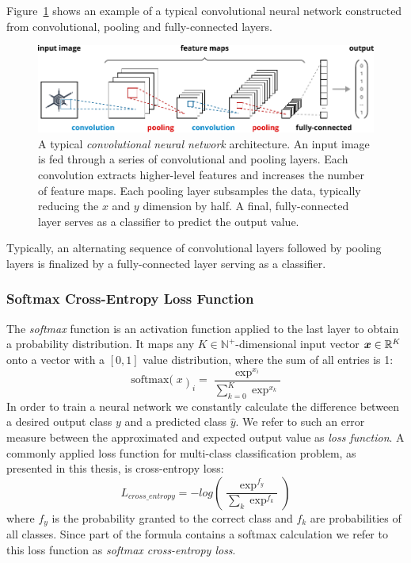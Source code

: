 	Figure~\ref{fig:convnet} shows an example of a typical convolutional neural network constructed from convolutional, pooling and fully-connected layers.
		\begin{figure}[tp]
  		\centering
    	\includegraphics{img/convnet.pdf}
    	\caption{A typical \emph{convolutional neural network} architecture. An input image is fed through a series of convolutional and pooling layers. Each convolution extracts higher-level features and increases the number of feature maps. Each pooling layer subsamples the data, typically reducing the $x$ and $y$ dimension by half. A final, fully-connected layer serves as a classifier to predict the output value.}
    	\label{fig:convnet}
	\end{figure}
	Typically, an alternating sequence of convolutional layers followed by pooling layers is finalized by a fully-connected layer serving as a  classifier.

\subsubsection{Softmax Cross-Entropy Loss Function}
The \emph{softmax} function is an activation function applied to the last layer to obtain a probability distribution. It maps any $K \in\mathbb{N}^+$-dimensional input vector $\boldsymbol{x} \in\mathbb{R}^K$ onto a vector with a $[0, 1]$ value distribution, where the sum of all entries is \num{1}:
%
$$
\operatorname{softmax(}x\operatorname{)}_i= \frac{\exp^{x_i}}{\sum_{k=0}^K \exp^{x_k}}
$$
%
In order to train a neural network we constantly calculate the difference between a desired output class $y$ and a predicted class $\hat{y}$. We refer to such an error measure between the approximated and expected output value as \emph{loss function}. A commonly applied loss function for multi-class classification problem, as presented in this thesis, is cross-entropy loss:
%
$$
L_{cross\_entropy} = -log \left( \frac{\exp^{f_y}}{\sum_k \exp^{f_k}} \right)
$$
%
where $f_y$ is the probability granted to the correct class and $f_k$ are probabilities of all classes. Since part of the formula contains a softmax calculation we refer to this loss function as \emph{softmax cross-entropy loss}.

